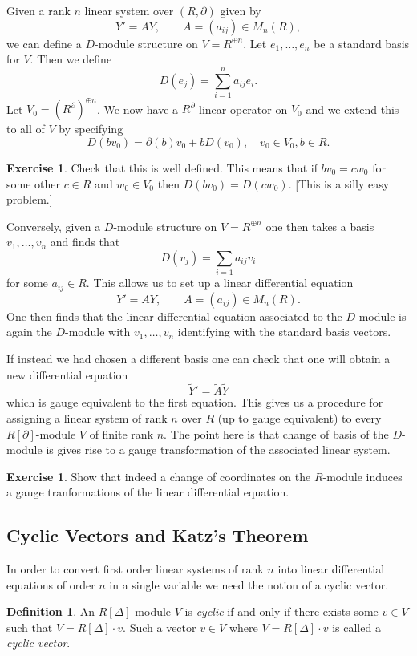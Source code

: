 \documentclass[12pt]{book}
\numberwithin{equation}{section}
\theoremstyle{definition}
\newtheorem{definition}[theorem]{Definition}
\newtheorem{exercise}[theorem]{Exercise}
\theoremstyle{remark}
\begin{document}
Given a rank $n$ linear system over $(R,\partial)$ given by 
$$ Y' = A Y, \qquad A = (a_{ij}) \in M_n(R), $$
we can define a $D$-module structure on $V=R^{\oplus n}$.
Let $e_1,\ldots,e_n$ be a standard basis for $V$.
Then we define 
$$ D(e_j) = \sum_{i=1}^n a_{ij} e_i.$$
Let $V_0 = (R^{\partial})^{\oplus n}$. 
We now have a $R^{\partial}$-linear operator on $V_0$ and we extend this to all of $V$ by specifying 
$$ D(b v_0) = \partial(b)v_0 + b D(v_0), \quad v_0 \in V_0, b \in R. $$
\begin{exercise}
	Check that this is well defined.
	This means that if $bv_0 = cw_0$ for some other $c \in R$ and $w_0 \in V_0$ then $D(bv_0) = D(cw_0)$. [This is a silly easy problem.]
\end{exercise}

Conversely, given a $D$-module structure on $V = R^{\oplus n}$ one then takes a basis $v_1,\ldots, v_n$ and finds that 
$$ D(v_j) = \sum_{i=1}a_{ij}v_i $$
for some $a_{ij}\in R$. 
This allows us to set up a linear differential equation 
$$ Y' = AY, \qquad A = (a_{ij}) \in M_n(R).$$
One then finds that the linear differential equation associated to the $D$-module is again the $D$-module with $v_1,\ldots,v_n$ identifying with the standard basis vectors. 

If instead we had chosen a different basis one can check that one will obtain a new differential equation
$$ \widetilde{Y}' = \widetilde{A} \widetilde{Y} $$
which is gauge equivalent to the first equation. 
This gives us a procedure for assigning a linear system of rank $n$ over $R$ (up to gauge equivalent) to every $R[\partial]$-module $V$ of finite rank $n$.
The point here is that change of basis of the $D$-module is gives rise to a gauge transformation of the associated linear system.

\begin{exercise}
	Show that indeed a change of coordinates on the $R$-module induces a gauge tranformations of the linear differential equation.
\end{exercise}

\subsection{Cyclic Vectors and Katz's Theorem}\label{S:cyclic-vectors}
In order to convert first order linear systems of rank $n$ into linear differential equations of  order $n$ in a single variable we need the notion of a cyclic vector. 
\begin{definition}
	An $R[\Delta]$-module $V$ is \emph{cyclic} if and only if there exists some $v \in V$ such that $V = R[\Delta]\cdot v$. 
	Such a vector $v \in V$ where $V = R[\Delta]\cdot v$ is called a \emph{cyclic vector}.
\end{definition}
\end{document}
